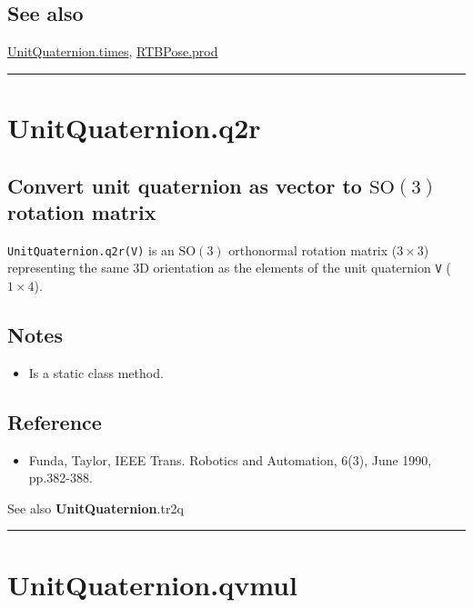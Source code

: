 \subsection*{See also}


\hyperlink{UnitQuaternion.times}{\color{blue} UnitQuaternion.times}, \hyperlink{RTBPose.prod}{\color{blue} RTBPose.prod}

\vspace{1.5ex}\hrule

\hypertarget{UnitQuaternion.q2r}{\section*{UnitQuaternion.q2r}}
\subsection*{Convert unit quaternion as vector to $\mbox{SO}(3)$ rotation matrix}


\texttt{UnitQuaternion.q2r(V)} is an $\mbox{SO}(3)$ orthonormal rotation matrix ($3 \times 3$) representing the
same 3D orientation as the elements of the unit quaternion \texttt{V} ($1 \times 4$).


\subsection*{Notes}
\begin{itemize}
  \item Is a static class method.
\end{itemize}

\subsection*{Reference}
\begin{itemize}
  \item Funda, Taylor, IEEE Trans. Robotics and Automation, 6(3), June 1990, pp.382-388.
\end{itemize}


See also \textbf{\color{red} UnitQuaternion}.tr2q

\vspace{1.5ex}\hrule

\hypertarget{UnitQuaternion.qvmul}{\section*{UnitQuaternion.qvmul}}
